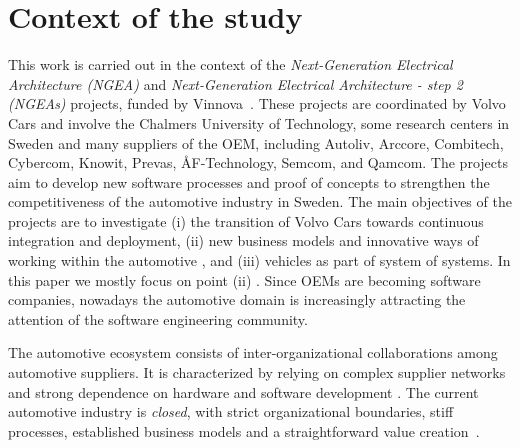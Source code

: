 \section{Context of the study}\label{sec:context}


This work is carried out in the context of the {\em Next-Generation Electrical Architecture (NGEA)} and {\em Next-Generation Electrical Architecture - step 2 (NGEAs)} projects, funded by Vinnova~\cite{Vinnova}. 
These projects are coordinated by Volvo Cars and involve the Chalmers University of Technology, some research centers in Sweden and many suppliers of the OEM, including Autoliv, Arccore, Combitech, Cybercom, Knowit, Prevas, \AA F-Technology, Semcom, and Qamcom. The projects aim to develop new software processes and proof of concepts to strengthen the competitiveness of the automotive industry in Sweden. 
The main objectives of the projects are to investigate (i) the transition of Volvo Cars towards continuous integration and deployment, (ii) new business models and innovative ways of working within the automotive , and (iii) vehicles as part of system of systems. 
In this paper we mostly focus on point (ii) . Since OEMs are becoming software companies, nowadays the automotive domain is increasingly attracting the attention of the software engineering community.  

The automotive ecosystem consists of inter-organizational collaborations among automotive suppliers. It is characterized by relying on complex supplier networks and strong dependence on hardware and software development \cite{Knauss2014d}.
The current automotive industry is {\em closed}, with strict organizational boundaries, stiff processes, established business models and a straightforward value creation~\cite{ConnectedVehicle2012}.


